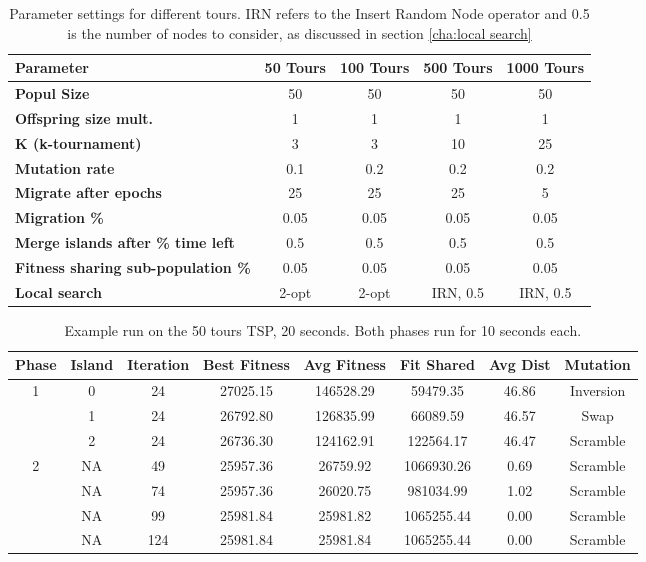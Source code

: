 \documentclass[a4paper,10pt]{article}
\begin{document}
	
	\begin{table}[ht]
		\centering
		\small
		\begin{tabular}{|l|c|c|c|c|}
			\hline
			\textbf{Parameter} & \textbf{50 Tours} & \textbf{100 Tours} & \textbf{500 Tours} & \textbf{1000 Tours} \\
			\hline
			\textbf{Popul Size} & 50 & 50 & 50 & 50 \\
			\textbf{Offspring size mult.} & 1 & 1 & 1 & 1 \\
			\textbf{K (k-tournament)} & 3 & 3 & 10 & 25 \\
			\textbf{Mutation rate} & 0.1 & 0.2 & 0.2 & 0.2 \\
			\textbf{Migrate after epochs} & 25 & 25 & 25 & 5 \\
			\textbf{Migration \%} & 0.05 & 0.05 & 0.05 & 0.05 \\
			\textbf{Merge islands after \% time left} & 0.5 & 0.5 & 0.5 & 0.5 \\
			\textbf{Fitness sharing sub-population \%} & 0.05 & 0.05 & 0.05 & 0.05 \\
			\textbf{Local search} & 2-opt & 2-opt & IRN, 0.5 & IRN, 0.5 \\
			\hline
		\end{tabular}
		\caption{Parameter settings for different tours. IRN refers to the Insert Random Node operator and 0.5 is the number of nodes to consider, as discussed in section \ref{cha:local search}}
		\label{tbl:params}
	\end{table}
	
	
		
	\begin{table}[ht]
		\centering
		\begin{tabular}{|c|c|c|c|c|c|c|c|}
			\hline
			\textbf{Phase} & \textbf{Island} & \textbf{Iteration} & \textbf{Best Fitness} & \textbf{Avg Fitness} & \textbf{Fit Shared} & \textbf{Avg Dist} & \textbf{Mutation} \\
			\hline
			\multirow{3}{*}{1} & 0 & 24 & 27025.15 & 146528.29 & 59479.35 & 46.86 & Inversion\\
			& 1 & 24 & 26792.80 & 126835.99 & 66089.59 & 46.57 & Swap \\
			& 2 & 24 & 26736.30 & 124162.91 & 122564.17 & 46.47 & Scramble\\
			\hline
			\multirow{4}{*}{2} & NA & 49 & 25957.36 & 26759.92 & 1066930.26 & 0.69 & Scramble\\
			& NA & 74 & 25957.36 & 26020.75 & 981034.99 & 1.02 & Scramble \\
			& NA & 99 & 25981.84 & 25981.82 & 1065255.44 & 0.00 & Scramble\\
			& NA & 124 & 25981.84 & 25981.84 & 1065255.44 & 0.00 & Scramble\\
			\hline
		\end{tabular}
		\caption{Example run on the 50 tours TSP, 20 seconds. Both phases run for 10 seconds each.}
		\label{tbl:convergence}
	\end{table}
	
\end{document}
